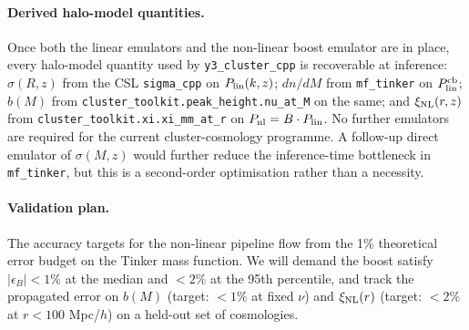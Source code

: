 \documentclass[11pt]{article}
\begin{document}
\paragraph{Derived halo-model quantities.} Once both the linear
emulators and the non-linear boost emulator are in place, every
halo-model quantity used by \texttt{y3\_cluster\_cpp} is recoverable
at inference: $\sigma(R, z)$ from the CSL \texttt{sigma\_cpp} on
$P_{\rm lin}(k, z)$; $dn/dM$ from \texttt{mf\_tinker} on
$P^{\rm cb}_{\rm lin}$; $b(M)$ from
\texttt{cluster\_toolkit.peak\_height.nu\_at\_M} on the same; and
$\xi_{\rm NL}(r, z)$ from
\texttt{cluster\_toolkit.xi.xi\_mm\_at\_r} on
$P_{\rm nl} = B \cdot P_{\rm lin}$. No further emulators are required
for the current cluster-cosmology programme. A follow-up direct
emulator of $\sigma(M, z)$ would further reduce the inference-time
bottleneck in \texttt{mf\_tinker}, but this is a second-order
optimisation rather than a necessity.

\paragraph{Validation plan.} The accuracy targets for the non-linear
pipeline flow from the 1\% theoretical error budget on the Tinker
mass function. We will demand the boost satisfy $|\epsilon_B| < 1\%$
at the median and $< 2\%$ at the 95th percentile, and track the
propagated error on $b(M)$ (target: $< 1\%$ at fixed $\nu$) and
$\xi_{\rm NL}(r)$ (target: $< 2\%$ at $r < 100$ Mpc/$h$) on a
held-out set of cosmologies.
\end{document}
